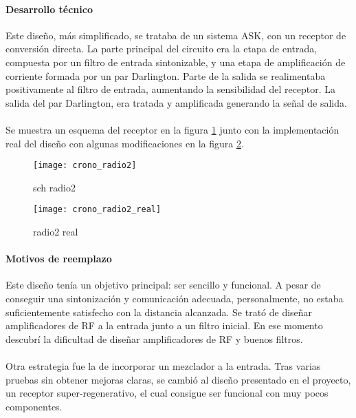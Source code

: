 \paragraph{Desarrollo técnico}
Este diseño, más simplificado, se trataba de un sistema ASK, con un receptor de conversión directa. 
La parte principal del circuito era la etapa de entrada, compuesta por un filtro de entrada sintonizable, y una etapa de amplificación de corriente formada por un par Darlington. Parte de la salida se realimentaba positivamente al filtro de entrada, aumentando la sensibilidad del receptor. La salida del par Darlington, era tratada y amplificada generando la señal de salida. 
\paragraph{}
Se muestra un esquema del receptor en la figura \ref{fig:crono_radio2} junto con la implementaci\'on real del diseño con algunas modificaciones en la figura \ref{fig:crono_radio2_real}.
\begin{figure}[h!]
    \centering
    \texttt{[image: crono\_radio2]}
    \caption{sch radio2}
    \label{fig:crono_radio2}
\end{figure}

\begin{figure}[h!]
    \centering
    \texttt{[image: crono\_radio2\_real]}
    \caption{radio2 real}
    \label{fig:crono_radio2_real}
\end{figure}

\paragraph{Motivos de reemplazo}
Este diseño tenía un objetivo principal: ser sencillo y funcional.
A pesar de conseguir una sintonización y comunicación adecuada, personalmente, no estaba suficientemente satisfecho con la distancia alcanzada. Se trató de diseñar amplificadores de RF a la entrada junto a un filtro inicial. En ese momento descubrí la dificultad de diseñar amplificadores de RF y buenos filtros. 
\paragraph{}
Otra estrategia fue la de incorporar un mezclador a la entrada. Tras varias pruebas sin obtener mejoras claras, se cambió al diseño presentado en el proyecto, un receptor super-regenerativo, el cual consigue ser funcional con muy pocos componentes.
